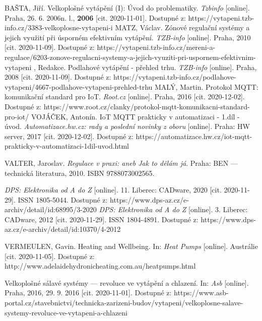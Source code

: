 \begin{thebibliography}{3}
BAŠTA, Jiří. Velkoplošné vytápění (I): Úvod do problematiky. \textit{Tzbinfo} [online]. Praha, 26. 6. 2006n. l., \textbf{2006} [cit. 2020-11-01]. Dostupné z: https://vytapeni.tzb-info.cz/3383-velkoplosne-vytapeni-i
MATZ, Václav. Zónové regulační systémy a jejich využití při úsporném efektivním vytápění. \textit{TZB-info} [online]. Praha, 2010 [cit. 2020-11-09]. Dostupné z: https://vytapeni.tzb-info.cz/mereni-a-regulace/6203-zonove-regulacni-systemy-a-jejich-vyuziti-pri-uspornem-efektivnim-vytapeni
, Redakce. Podlahové vytápění - přehled trhu. \textit{TZB-info} [online]. Praha, 2008 [cit. 2020-11-09]. Dostupné z: https://vytapeni.tzb-info.cz/podlahove-vytapeni/4667-podlahove-vytapeni-prehled-trhu
MALÝ, Martin. Protokol MQTT: komunikační standard pro IoT. \textit{Root.cz} [online]. Praha, 2016 [cit. 2020-12-02]. Dostupné z: https://www.root.cz/clanky/protokol-mqtt-komunikacni-standard-pro-iot/
VOJÁČEK, Antonín. IoT MQTT prakticky v automatizaci - 1.díl - úvod. \textit{Automatizace.hw.cz: rady a poslední novinky z oboru} [online]. Praha: HW server, 2017 [cit. 2020-12-02]. Dostupné z: https://automatizace.hw.cz/iot-mqtt-prakticky-v-automatizaci-1dil-uvod.html

VALTER, Jaroslav. \textit{Regulace v praxi: aneb Jak to dělám já}. Praha: BEN --- technická literatura, 2010. ISBN 9788073002565.

\textit{DPS: Elektronika od A do Z} [online]. 11. Liberec: CADware, 2020 [cit. 2020-11-29]. ISSN 1805-5044. Dostupné z: https://www.dps-az.cz/e-archiv/detail/id:68995/3-2020
\textit{DPS: Elektronika od A do Z} [online]. 3. Liberec: CADware, 2012 [cit. 2020-11-29]. ISSN 1804-4891. Dostupné z: https://www.dps-az.cz/e-archiv/detail/id:10370/4-2012


VERMEULEN, Gavin. Heating and Wellbeing. In: \textit{Heat Pumps} [online]. Austrálie [cit. 2020-11-05]. Dostupné z: http://www.adelaidehydronicheating.com.au/heatpumps.html

Velkoplošné sálavé systémy --- revoluce ve vytápění a chlazení. In: \textit{Asb} [online]. Praha, 2016, 29. 9. 2016 [cit. 2020-11-01]. Dostupné z: https://www.asb-portal.cz/stavebnictvi/technicka-zarizeni-budov/vytapeni/velkoplosne-salave-systemy-revoluce-ve-vytapeni-a-chlazeni


\end{thebibliography}
